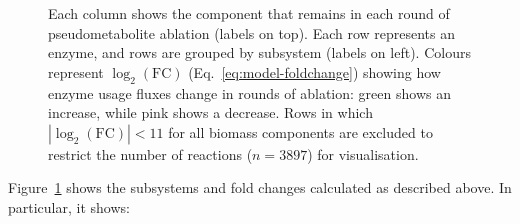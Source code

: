 \begin{figure}
{    %
    Each column shows the component that remains in each round of pseudometabolite ablation (labels on top).
    Each row represents an enzyme, and rows are grouped by subsystem (labels on left).
    Colours represent $\log_{2}(\mathrm{FC})$ (Eq.\ \ref{eq:model-foldchange}) showing how enzyme usage fluxes change in rounds of ablation: green shows an increase, while pink shows a decrease.
    Rows in which $|\log_{2}(\mathrm{FC})| < 11$ for all biomass components are excluded to restrict the number of reactions ($n = \num{3897}$) for visualisation.
  }
  \label{fig:model-ablate-enz-use}
\end{figure}

Figure~\ref{fig:model-ablate-enz-use} shows the subsystems and fold changes calculated as described above.
In particular, it shows:

